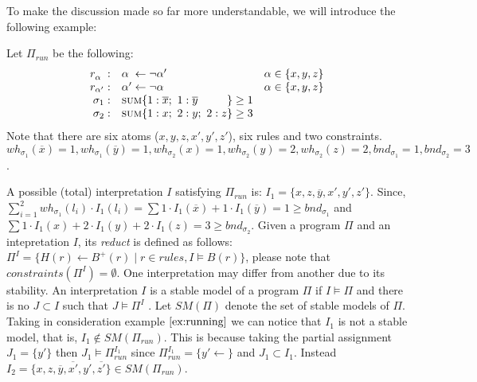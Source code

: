 To make the discussion made so far more understandable, we will introduce the following example:
\begin{example}
    \label{ex:running}
    Let $\Pi_{\mathit{run}}$ be the following:
    \begin{align*}
        \begin{array}{rll}
            r_{\alpha\phantom{'}}: & \alpha\phantom{'} \leftarrow \neg \alpha' & \alpha \in \{x,y,z\}\\
            r_{\alpha'}: & \alpha' \leftarrow \neg \alpha & \alpha \in \{x,y,z\}\\ 
            \sigma_{1}: & \textsc{sum}\{
                1 : \overline{x};\ 1 : \overline{y}\phantom{;\ 2 : z}
            \} \geq 1 \\
            \sigma_{2}: & \textsc{sum}\{
                1 : x;\ 2 : y;\ 2 : z
            \} \geq 3
        \end{array}
    \end{align*}
Note that there are six atoms ($x,y,z,x',y',z'$), six rules and two constraints.
$\mathit{wh}_{\sigma_1}(\overline{x}) = 1, \mathit{wh}_{\sigma_1}(\overline{y}) = 1,
\mathit{wh}_{\sigma_2}(x) = 1,\mathit{wh}_{\sigma_2}(y) = 2,
\mathit{wh}_{\sigma_2}(z) = 2, \mathit{bnd}_{\sigma_1}=1,\mathit{bnd}_{\sigma_2}=3$.
\end{example}
A possible (total) interpretation $I$ satisfying $\Pi_{\mathit{run}}$ is:
$I_1 = \{ x, z, \overline{y}, x', y', z' \}$.
Since, $\sum_{i=1}^{2} \mathit{wh}_{\sigma_1}(l_i) \cdot I_1(l_i) = 
\sum 1 \cdot I_1(\overline{x}) + 1 \cdot I_1(\overline{y}) = 1 \ge \mathit{bnd}_{\sigma_1}$
and $\sum 1 \cdot I_1(x) + 2 \cdot I_1(y) + 2 \cdot I_1(z) = 3 \ge \mathit{bnd}_{\sigma_2}$.
Given a program $\Pi$ and an intepretation $I$, its \textit{reduct} is
defined as follows: $\Pi^{I} = \{ H(r) \leftarrow B^+(r) \mid r \in \mathit{rules}, I \models B(r)\}$,
please note that $\mathit{constraints}(\Pi^{I}) = \emptyset$.
One interpretation may differ from another due to its stability.
An interpretation $I$ is a stable model of a program $\Pi$ if $I \models \Pi$ and there is 
no $J \subset I$ such that $J \models \Pi^I$ .
Let $\mathit{SM}(\Pi)$ denote the set of stable models of $\Pi$.
Taking in consideration example $\ref{ex:running}$ we can notice that 
$I_1$ is not a stable model, that is, $I_1 \not\in \mathit{SM}(\Pi_{\mathit{run}})$.
This is because taking the partial assignment $J_1 = \{y'\}$
then $ J_1  \models \Pi_{\mathit{run}}^{I_1}$ since $\Pi_{\mathit{run}}^{I_1} = \{ y' \leftarrow  \}$
and $J_1 \subset I_1$.
Instead $I_2 = \{ x, z, \overline{y}, \overline{x'}, y', \overline{z'} \} \in \mathit{SM}(\Pi_{\mathit{run}})$.

